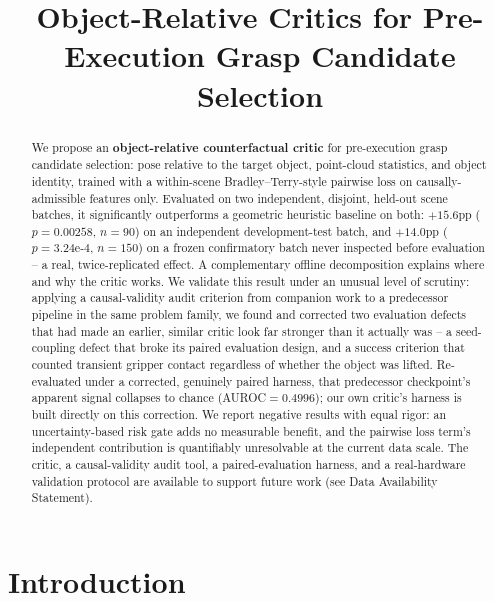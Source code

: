 \documentclass[journal]{IEEEtran}
\title{Object-Relative Critics for Pre-Execution Grasp Candidate Selection}
\begin{document}
\maketitle
\thispagestyle{empty}
\pagestyle{empty}

\begin{abstract}
We propose an \textbf{object-relative counterfactual critic} for
pre-execution grasp candidate selection: pose relative to the target
object, point-cloud statistics, and object identity, trained with a
within-scene Bradley--Terry-style pairwise loss on causally-admissible
features only. Evaluated on two independent, disjoint, held-out scene
batches, it significantly outperforms a geometric heuristic baseline on
both: $+15.6$pp ($p{=}0.00258$, $n{=}90$) on an independent
development-test batch, and $+14.0$pp ($p{=}3.24\text{e-}4$, $n{=}150$) on
a frozen confirmatory batch never inspected before evaluation -- a real,
twice-replicated effect. A complementary offline decomposition explains
where and why the critic works. We validate this result under an unusual
level of scrutiny: applying a causal-validity audit criterion from
companion work to a predecessor pipeline in the same problem family, we
found and corrected two evaluation defects that had made an earlier,
similar critic look far stronger than it actually was -- a seed-coupling
defect that broke its paired evaluation design, and a success criterion
that counted transient gripper contact regardless of whether the object
was lifted. Re-evaluated under a corrected, genuinely paired harness, that
predecessor checkpoint's apparent signal collapses to chance
(AUROC$=0.4996$); our own critic's harness is built directly on this
correction. We report negative results with equal rigor: an
uncertainty-based risk gate adds no measurable benefit, and the pairwise
loss term's independent contribution is quantifiably unresolvable at the
current data scale. The critic, a causal-validity audit tool, a
paired-evaluation harness, and a real-hardware validation protocol are
available to support future work (see Data Availability Statement).
\end{abstract}

\section{Introduction}
\label{sec:intro}
\end{document}
